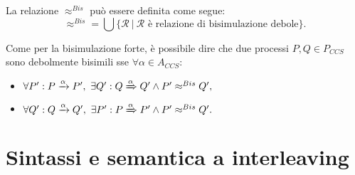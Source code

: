 \begin{deff}
	La relazione $ \approx^{Bis}$ pu\`o essere definita come segue: $$\approx^{Bis} = \bigcup \{\mathcal{R}\ |\ \mathcal{R} \text{ \`e relazione di bisimulazione debole}\}. $$
\end{deff}
Come per la bisimulazione forte, \`e possibile dire che due processi $P, Q \in P_{CCS}$ sono debolmente bisimili sse $\forall \alpha \in A_{CCS}$: 
\begin{itemize}
	\item $\forall P' : P \xrightarrow{\alpha}P',\ \exists Q': Q \xRightarrow{\alpha}Q' \land P' \approx^{Bis} Q',$
	\item $\forall Q' : Q \xrightarrow{\alpha}Q',\ \exists P': P \xRightarrow{\alpha}P' \land P' \approx^{Bis} Q'.$
\end{itemize}

\section{Sintassi e semantica a interleaving}

